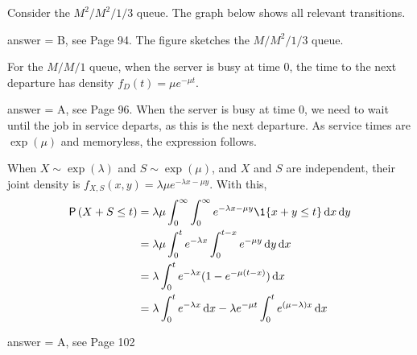 \begin{exercise}[201804]
  Consider the $M^2/M^2/1/3$ queue.  The graph below shows all relevant transitions.

  \begin{center}
  \end{center}
\begin{solution}
answer = B, see Page 94. The figure sketches the $M/M^2/1/3$ queue.
\end{solution}
\end{exercise}

\begin{exercise}[201804]
For the $M/M/1$ queue, when the server is busy at time $0$,  the  time to the next departure has density $f_D(t) = \mu e^{-\mu t}$.
\begin{solution}
answer = A, see Page 96. When the server is busy at time $0$, we need to wait until the job in service departs, as this is the next departure. As service times are $\exp(\mu)$ and memoryless, the expression follows.
\end{solution}
\end{exercise}

\begin{exercise}[201804]
When $X\sim \exp(\lambda)$ and $S\sim\exp(\mu)$, and $X$ and $S$ are independent, their joint density is $f_{X,S}(x,y) = \lambda \mu e^{-\lambda x - \mu y}$. With this,
  \begin{align*}
\P{X+S\leq t } 
&= \lambda \mu \int_0^\infty \int_0^\infty e^{-\lambda x - \mu y} \1{x+y\leq t} \d x \d y \\
&= \lambda \mu \int_0^t e^{-\lambda x} \int_0^{t-x} e^{- \mu y} \d y \d x \\
&= \lambda \int_0^t e^{-\lambda x} (1-e^{- \mu (t-x)} ) \d x  \\
&= \lambda \int_0^t e^{-\lambda x}  \d x - \lambda e^{-\mu t} \int_0^t e^{(\mu-\lambda) x} \d x \\
  \end{align*}
\begin{solution}
answer = A, see Page 102
\end{solution}
\end{exercise}

